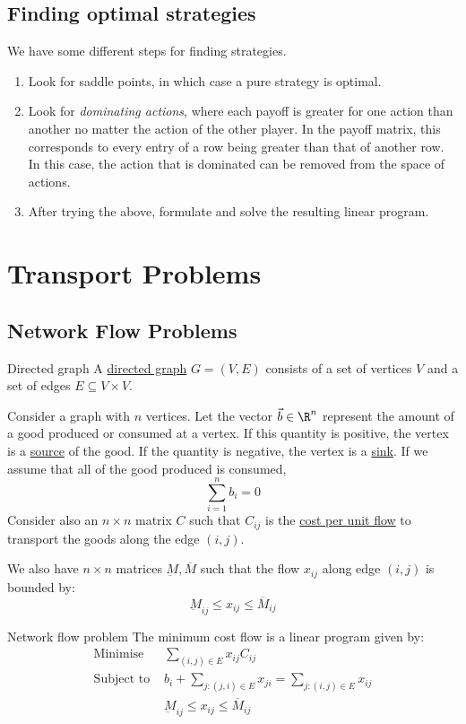 \documentclass[../Main.tex]{subfiles}
\begin{document}
\subsection{Finding optimal strategies}
We have some different steps for finding strategies.
\begin{enumerate}
    \item Look for saddle points, in which case a pure strategy is optimal.
    \item Look for \textit{dominating actions}, where each payoff is greater for one action than another no matter the action of the other player. In the payoff matrix, this corresponds to every entry of a row being greater than that of another row. In this case, the action that is dominated can be removed from the space of actions.
    \item After trying the above, formulate and solve the resulting linear program.
\end{enumerate}
\section{Transport Problems}
\subsection{Network Flow Problems}
\begin{definition}{Directed graph}
    A \underline{directed graph} $G = (V, E)$ consists of a set of vertices $V$ and a set of edges $E \subseteq V \times V$.
\end{definition}
Consider a graph with $n$ vertices. Let the vector $\vec{b} \in \R^n$ represent the amount of a good produced or consumed at a vertex. If this quantity is positive, the vertex is a \underline{source} of the good. If the quantity is negative, the vertex is a \underline{sink}. If we assume that all of the good produced is consumed,
\begin{equation*}
    \sum_{i = 1}^n b_i = 0
\end{equation*}
Consider also an $n \times n$ matrix $C$ such that $C_{ij}$ is the \underline{cost per unit flow} to transport the goods along the edge $(i, j)$.

We also have $n \times n$ matrices $\underbar{M}, \overline{M}$ such that the flow $x_{ij}$ along edge $(i, j)$ is bounded by:
\begin{equation*}
    \underbar{M}_{ij} \leq x_{ij} \leq \overline{M}_{ij}
\end{equation*}
\begin{definition}{Network flow problem}
    The minimum cost flow is a linear program given by:
    \begin{align*}
        \text{Minimise } &\sum_{(i, j) \in E} x_{ij} C_{ij} \\
        \text{Subject to } &b_i + \sum_{j : (j,i) \in E} x_{ji} = \sum_{j : (i, j) \in E} x_{ij} \\
        & \underbar{M}_{ij} \leq x_{ij} \leq \overline{M}_{ij}
    \end{align*}
\end{definition}
\end{document}
